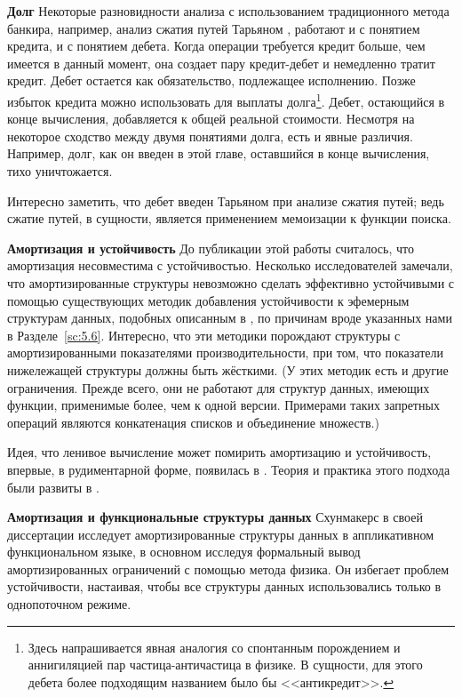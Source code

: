 \noindent
\textbf{Долг} Некоторые разновидности анализа с использованием
традиционного метода банкира, например, анализ сжатия путей Тарьяном
\cite{Tarjan1983}, работают и с понятием кредита, и с понятием
дебета.  Когда операции требуется кредит больше, чем имеется в данный
момент, она создает пару кредит-дебет и немедленно тратит
кредит. Дебет остается как обязательство, подлежащее исполнению. Позже
избыток кредита можно использовать для выплаты долга\footnote{Здесь
  напрашивается явная аналогия со спонтанным порождением и
  аннигиляцией пар частица-античастица в физике. В сущности, для этого
  дебета более подходящим названием было бы <<антикредит>>.
}.
Дебет, остающийся в конце вычисления, добавляется к общей реальной
стоимости. Несмотря на некоторое сходство между двумя понятиями долга,
есть и явные различия. Например, долг, как он введен в этой главе,
оставшийся в конце вычисления, тихо уничтожается.

Интересно заметить, что дебет введен Тарьяном при анализе сжатия
путей; ведь сжатие путей, в сущности, является применением мемоизации
к функции поиска.

\noindent
\textbf{Амортизация и устойчивость} До публикации этой работы
считалось, что амортизация несовместима с устойчивостью.  Несколько
исследователей \cite{DriscollSleatorTarjan1994, Raman1992} замечали,
что амортизированные структуры невозможно сделать эффективно
устойчивыми с помощью существующих методик добавления устойчивости к
эфемерным структурам данных, подобных описанным в
\cite{Driscoll-etal1989, Dietz1989}, по причинам вроде указанных нами в
Разделе~\ref{sc:5.6}. Интересно, что эти методики порождают структуры
с амортизированными показателями производительности, при том, что
показатели нижележащей структуры должны быть жёсткими. (У этих методик
есть и другие ограничения. Прежде всего, они не работают для структур
данных, имеющих функции, применимые более, чем к одной
версии. Примерами таких запретных операций являются конкатенация
списков и объединение множеств.)

Идея, что ленивое вычисление может помирить амортизацию и устойчивость,
впервые, в рудиментарной форме, появилась в
\cite{Okasaki1995c}. Теория и практика этого подхода были развиты в
\cite{Okasaki1995a, Okasaki1996b}.

\noindent
\textbf{Амортизация и функциональные структуры данных} Схунмакерс
\cite{Schoenmakers1993} в своей диссертации исследует амортизированные
структуры данных в аппликативном функциональном языке, в основном
исследуя формальный вывод амортизированных ограничений с помощью
метода физика. Он избегает проблем устойчивости, настаивая, чтобы все
структуры данных использовались только в однопоточном режиме.

